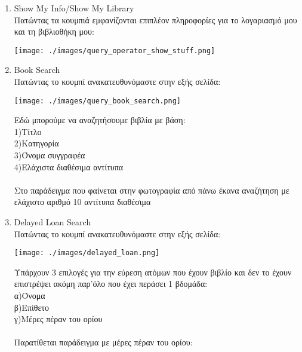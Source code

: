 \documentclass[14pt]{report}
\begin{document}
\begin{enumerate}
		\begin{enumerate}
			\newpage
			\hypertarget{o-show-info-lib}{}
			\item Show My Info/Show My Library \\
			Πατώντας τα κουμπιά εμφανίζονται επιπλέον πληροφορίες για το λογαριασμό μου και τη βιβλιοθήκη μου: \\
			\vspace{\baselineskip}
			
			\texttt{[image: ./images/query\_operator\_show\_stuff.png]}
			
			\vspace{\baselineskip}
			
			\newpage
			\hypertarget{o-book-search}{}
			\item Book Search \\
			Πατώντας το κουμπί ανακατευθυνόμαστε στην εξής σελίδα: \\
			
			\vspace{\baselineskip}
			
			\texttt{[image: ./images/query\_book\_search.png]}
			
			\vspace{\baselineskip}
			
			Εδώ μπορούμε να αναζητήσουμε βιβλία με βάση: \\
			1)Τίτλο \\
			2)Κατηγορία \\
			3)Όνομα συγγραφέα \\
			4)Ελάχιστα διαθέσιμα αντίτυπα \\ \\
			Στο παράδειγμα που φαίνεται στην φωτογραφία από πάνω έκανα αναζήτηση με ελάχιστο αριθμό 10 αντίτυπα διαθέσιμα
			
			\newpage 
			\hypertarget{o-delayed-loans}{}
			\item Delayed Loan Search \\
			Πατώντας το κουμπί ανακατευθυνόμαστε στην εξής σελίδα: \\
			
			\vspace{\baselineskip}
			
			\texttt{[image: ./images/delayed\_loan.png]}
			
			\vspace{\baselineskip}
			
			Υπάρχουν 3 επιλογές για την εύρεση ατόμων που έχουν βιβλίο και δεν το έχουν επιστρέψει ακόμη παρ'όλο που έχει περάσει 1 βδομάδα: \\
			α)Όνομα \\
			β)Επίθετο \\
			γ)Μέρες πέραν του ορίου \\ \\
			\newpage
			Παρατίθεται παράδειγμα με μέρες πέραν του ορίου: \\
			

\end{enumerate}
\end{enumerate}
\end{document}
